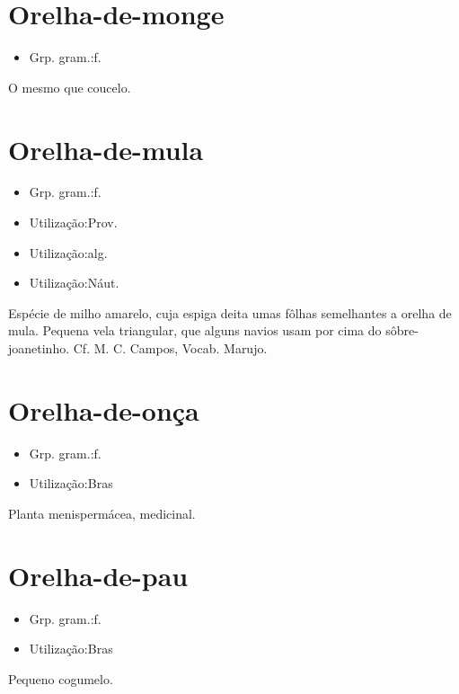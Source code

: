 \section{Orelha-de-monge}
\begin{itemize}
\item {Grp. gram.:f.}
\end{itemize}
O mesmo que \textunderscore coucelo\textunderscore .
\section{Orelha-de-mula}
\begin{itemize}
\item {Grp. gram.:f.}
\end{itemize}
\begin{itemize}
\item {Utilização:Prov.}
\end{itemize}
\begin{itemize}
\item {Utilização:alg.}
\end{itemize}
\begin{itemize}
\item {Utilização:Náut.}
\end{itemize}
Espécie de milho amarelo, cuja espiga deita umas fôlhas semelhantes a orelha de mula.
Pequena vela triangular, que alguns navios usam por cima do sôbre-joanetinho. Cf. M. C. Campos, \textunderscore Vocab. Marujo\textunderscore .
\section{Orelha-de-onça}
\begin{itemize}
\item {Grp. gram.:f.}
\end{itemize}
\begin{itemize}
\item {Utilização:Bras}
\end{itemize}
Planta menispermácea, medicinal.
\section{Orelha-de-pau}
\begin{itemize}
\item {Grp. gram.:f.}
\end{itemize}
\begin{itemize}
\item {Utilização:Bras}
\end{itemize}
Pequeno cogumelo.
